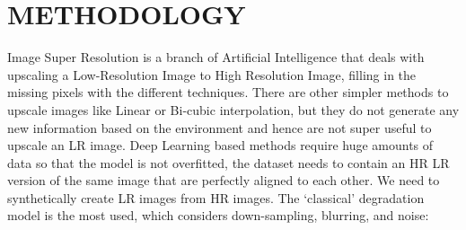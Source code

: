 \newpage
\section{METHODOLOGY}
Image Super Resolution is a branch of Artificial Intelligence that deals with upscaling a Low-Resolution Image to High Resolution Image, filling in the missing pixels with the different techniques. There are other simpler methods to upscale images like Linear or Bi-cubic interpolation, but they do not generate any new information based on the environment and hence are not super useful to upscale an LR image. Deep Learning based methods require huge amounts of data so that the model is not overfitted, the dataset needs to contain an HR  LR version of the same image that are perfectly aligned to each other. We need to synthetically create LR images from HR images.
The ‘classical’ degradation model is the most used, which considers down-sampling, blurring, and noise:
 
